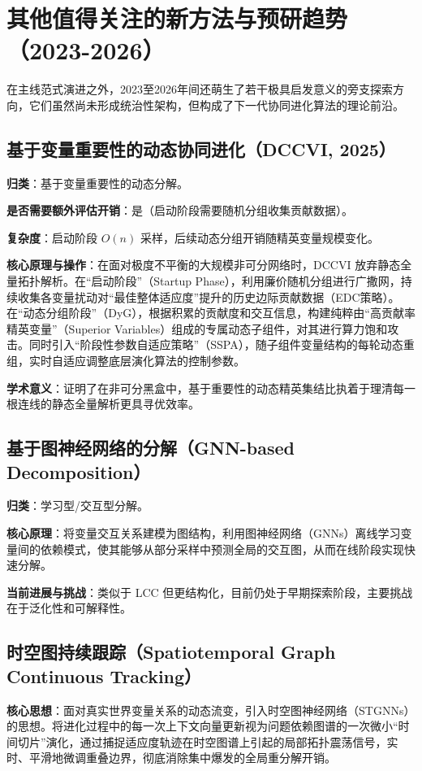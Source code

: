 \section{其他值得关注的新方法与预研趋势（2023-2026）}
在主线范式演进之外，2023至2026年间还萌生了若干极具启发意义的旁支探索方向，它们虽然尚未形成统治性架构，但构成了下一代协同进化算法的理论前沿。

\subsection{基于变量重要性的动态协同进化（DCCVI, 2025）}
\textbf{归类}：基于变量重要性的动态分解。

\textbf{是否需要额外评估开销}：是（启动阶段需要随机分组收集贡献数据）。

\textbf{复杂度}：启动阶段 $O(n)$ 采样，后续动态分组开销随精英变量规模变化。

\textbf{核心原理与操作}：在面对极度不平衡的大规模非可分网络时，DCCVI 放弃静态全量拓扑解析。在“启动阶段”（Startup Phase），利用廉价随机分组进行广撒网，持续收集各变量扰动对“最佳整体适应度”提升的历史边际贡献数据（EDC策略）。在“动态分组阶段”（DyG），根据积累的贡献度和交互信息，构建纯粹由“高贡献率精英变量”（Superior Variables）组成的专属动态子组件，对其进行算力饱和攻击。同时引入“阶段性参数自适应策略”（SSPA），随子组件变量结构的每轮动态重组，实时自适应调整底层演化算法的控制参数。

\textbf{学术意义}：证明了在非可分黑盒中，基于重要性的动态精英集结比执着于理清每一根连线的静态全量解析更具寻优效率。

\subsection{基于图神经网络的分解（GNN-based Decomposition）}
\textbf{归类}：学习型/交互型分解。

\textbf{核心原理}：将变量交互关系建模为图结构，利用图神经网络（GNNs）离线学习变量间的依赖模式，使其能够从部分采样中预测全局的交互图，从而在线阶段实现快速分解。

\textbf{当前进展与挑战}：类似于 LCC 但更结构化，目前仍处于早期探索阶段，主要挑战在于泛化性和可解释性。

\subsection{时空图持续跟踪（Spatiotemporal Graph Continuous Tracking）}
\textbf{核心思想}：面对真实世界变量关系的动态流变，引入时空图神经网络（STGNNs）的思想。将进化过程中的每一次上下文向量更新视为问题依赖图谱的一次微小“时间切片”演化，通过捕捉适应度轨迹在时空图谱上引起的局部拓扑震荡信号，实时、平滑地微调重叠边界，彻底消除集中爆发的全局重分解开销。

